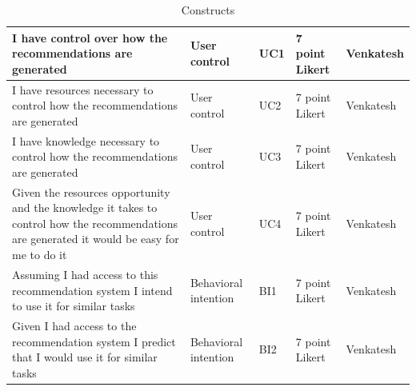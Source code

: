 \documentclass[a4paper,12pt]{article}
\newcommand{\citeyearonly}[1]{\citeyearpar{#1}}
\begin{document}
\begin{table}
{\begin{tabular}{|p{7cm}|l|p{2cm}|p{3cm}|p{3cm}|}
        I have control over how the recommendations are generated & User control & UC1 & 7 point Likert & Venkatesh \citeyearonly{venkateshDeterminantsPerceivedEase2000} \\ \hline
        I have resources necessary to control how the recommendations are generated & User control & UC2 & 7 point Likert & Venkatesh \citeyearonly{venkateshDeterminantsPerceivedEase2000} \\ \hline
        I have knowledge necessary to control how the recommendations are generated & User control & UC3 & 7 point Likert & Venkatesh \citeyearonly{venkateshDeterminantsPerceivedEase2000} \\ \hline
        Given the resources opportunity and the knowledge it takes to control how the recommendations are generated  it would be easy for me to do it & User control & UC4 & 7 point Likert & Venkatesh \citeyearonly{venkateshDeterminantsPerceivedEase2000} \\ \hline
        Assuming I had access to this recommendation system I intend to use it for similar tasks & Behavioral intention & BI1 & 7 point Likert & Venkatesh \citeyearonly{venkateshDeterminantsPerceivedEase2000} \\ \hline
        Given I had access to the recommendation system  I predict that I would use it for similar tasks & Behavioral intention & BI2 & 7 point Likert & Venkatesh \citeyearonly{venkateshDeterminantsPerceivedEase2000} \\ \hline
    \end{tabular}
    }
    \caption{Constructs}
    \label{tab:questionnaire_items}
\end{table}
\end{document}
